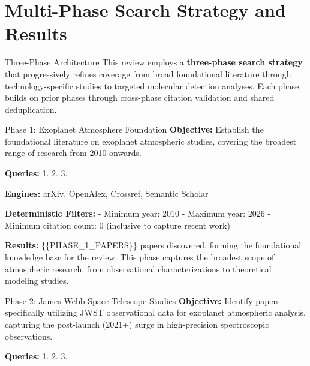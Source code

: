 \documentclass[
  ignorenonframetext,
]{beamer}
\author{}
\date{}
\begin{document}
\section{Multi-Phase Search Strategy and
Results}\label{multi-phase-search-strategy-and-results}

\begin{frame}{Three-Phase Architecture}
\label{three-phase-architecture}
This review employs a \textbf{three-phase search strategy} that
progressively refines coverage from broad foundational literature
through technology-specific studies to targeted molecular detection
analyses. Each phase builds on prior phases through cross-phase citation
validation and shared deduplication.

\begin{block}{Phase 1: Exoplanet Atmosphere Foundation}
\label{phase-1-exoplanet-atmosphere-foundation}
\textbf{Objective:} Establish the foundational literature on exoplanet
atmospheric studies, covering the broadest range of research from 2010
onwards.

\textbf{Queries:} 1.
 2.
 3.

\textbf{Engines:} arXiv, OpenAlex, Crossref, Semantic Scholar

\textbf{Deterministic Filters:} - Minimum year: 2010 - Maximum year:
2026 - Minimum citation count: 0 (inclusive to capture recent work)

\textbf{Results:} \{\{PHASE\_1\_PAPERS\}\} papers discovered, forming
the foundational knowledge base for the review. This phase captures the
broadest scope of atmospheric research, from observational
characterizations to theoretical modeling studies.
\end{block}

\begin{block}{Phase 2: James Webb Space Telescope Studies}
\label{phase-2-james-webb-space-telescope-studies}
\textbf{Objective:} Identify papers specifically utilizing JWST
observational data for exoplanet atmospheric analysis, capturing the
post-launch (2021+) surge in high-precision spectroscopic observations.

\textbf{Queries:} 1.
2.  3.


\end{block}
\end{frame}
\end{document}
